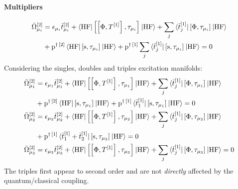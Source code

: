 \paragraph*{Multipliers}
  \begin{equation}\label{eq:2nd-order-mult}
    \begin{aligned}
    \bar{\Omega}_{\mu_i}^{[2]} &=
      \epsilon_{\mu_i}\bar{t}_{\mu_i}^{[2]}
      + \braket{\mathrm{HF} | \left[ \left[ \Phi, T^{[1]} \right]^{}, \tau_{\mu_i} \right]^{} | \mathrm{HF}}
      + \sum_j\braket{\bar{t}_{j}^{[1]} |
      \left[ \Phi, \tau_{\mu_i} \right]^{} | \mathrm{HF}} \\
      &+ \mathrm{p}^{\dagger\,[2]}\braket{\mathrm{HF} |
      \left[ \mathrm{s}, \tau_{\mu_i} \right]^{} | \mathrm{HF}}
      + \mathrm{p}^{\dagger\,[1]}
      \sum_j\braket{\bar{t}_{j}^{[1]} |
      \left[ \mathrm{s}, \tau_{\mu_i} \right]^{} | \mathrm{HF}}
      =0
    \end{aligned}
  \end{equation}
Considering the singles, doubles and triples excitation manifolds:
\begin{subequations}
  \begin{align}
    \bar{\Omega}_{\mu_1}^{[2]} &=
      \epsilon_{\mu_1}\bar{t}_{\mu_1}^{[2]}
      + \braket{\mathrm{HF} | \left[ \left[ \Phi, T^{[1]} \right]^{}, \tau_{\mu_1} \right]^{} | \mathrm{HF}}
      + \sum_j\braket{\bar{t}_{j}^{[1]} |
      \left[ \Phi, \tau_{\mu_1} \right]^{} | \mathrm{HF}} \\
      &+ \mathrm{p}^{\dagger\,[2]}\braket{\mathrm{HF} |
      \left[ \mathrm{s}, \tau_{\mu_1} \right]^{} | \mathrm{HF}}
      + \mathrm{p}^{\dagger\,[1]}
      \braket{\bar{t}_{1}^{[1]} |
      \left[ \mathrm{s}, \tau_{\mu_1} \right]^{} | \mathrm{HF}}
      =0 \\
    \bar{\Omega}_{\mu_2}^{[2]} &=
      \epsilon_{\mu_2}\bar{t}_{\mu_2}^{[2]}
      + \braket{\mathrm{HF} | \left[ \left[ \Phi, T^{[1]} \right]^{}, \tau_{\mu_2} \right]^{} | \mathrm{HF}}
      + \sum_j\braket{\bar{t}_{j}^{[1]} |
      \left[ \Phi, \tau_{\mu_2} \right]^{} | \mathrm{HF}} \\
      &+ \mathrm{p}^{\dagger\,[1]}
      \braket{\bar{t}_{1}^{[1]} + \bar{t}_{2}^{[1]} |
      \left[ \mathrm{s}, \tau_{\mu_2} \right]^{} | \mathrm{HF}}
      =0 \\
    \bar{\Omega}_{\mu_3}^{[2]} &=
      \epsilon_{\mu_3}\bar{t}_{\mu_3}^{[2]}
      + \braket{\mathrm{HF} | \left[ \left[ \Phi, T^{[1]} \right]^{}, \tau_{\mu_3} \right]^{} | \mathrm{HF}}
      + \sum_j\braket{\bar{t}_{j}^{[1]} |
      \left[ \Phi, \tau_{\mu_3} \right]^{} | \mathrm{HF}}
      =0
  \end{align}
\end{subequations}
The triples first appear to second order and are not \emph{directly}
affected by the quantum/classical coupling.

